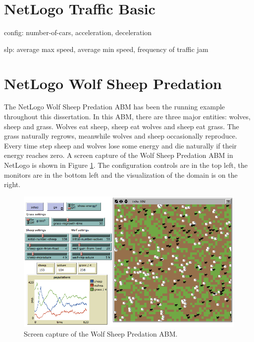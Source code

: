 


 \section{NetLogo Traffic Basic}

config: number-of-cars, acceleration, deceleration

slp: average max speed, average min speed, frequency of traffic jam






 \section{NetLogo Wolf Sheep Predation}
The NetLogo Wolf Sheep Predation ABM has been the running example throughout this dissertation.
In this ABM, there are three major entities: wolves, sheep and grass.
Wolves eat sheep, sheep eat wolves and sheep eat grass.
The grass naturally regrows, meanwhile wolves and sheep occasionally reproduce.
Every time step sheep and wolves lose some energy and die naturally if their energy reaches zero.
A screen capture of the Wolf Sheep Predation ABM in NetLogo is shown in Figure \ref{fig:wolfsheepss}.
The configuration controls are in the top left, the monitors are in the bottom left and the visualization of the domain is on the right.

\begin{figure}[ht]
\centering
\includegraphics[scale=.4]{images/wolfsheep_ss.png}
\caption{Screen capture of the Wolf Sheep Predation ABM.}
\label{fig:wolfsheepss}
\end{figure}


